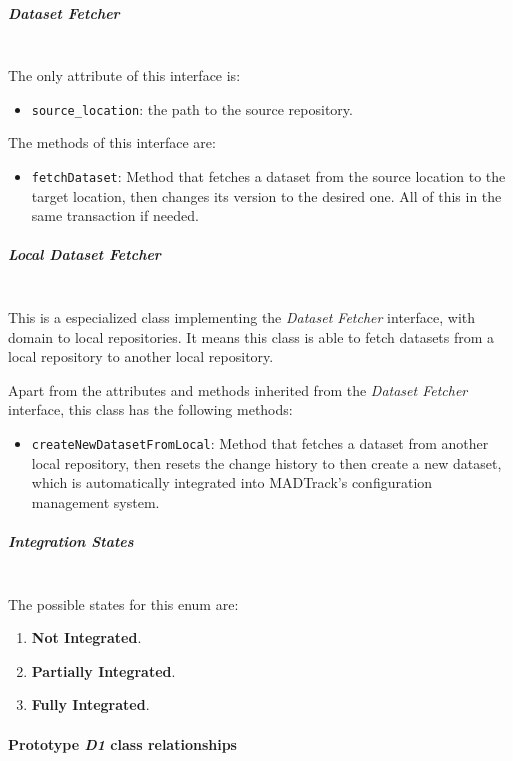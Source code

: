 \subparagraph{Dataset Fetcher}\mbox{}\\

The only attribute of this interface is:

\begin{itemize}
    \item \texttt{source\_location}: the path to the source repository.
\end{itemize}

The methods of this interface are:

\begin{itemize}
    \item \texttt{fetchDataset}: Method that fetches a dataset from the source location to the target location, then changes its version to the desired one. All of this
    in the same transaction if needed.
\end{itemize}

\subparagraph{Local Dataset Fetcher}\mbox{}\\

This is a especialized class implementing the \emph{Dataset Fetcher} interface, with domain to local repositories. It means this class is able to fetch datasets from a local 
repository to another local repository.

Apart from the attributes and methods inherited from the \emph{Dataset Fetcher} interface, this class has the following methods:

\begin{itemize}
    \item \texttt{createNewDatasetFromLocal}: Method that fetches a dataset from another local repository, then resets the change history to then create a new dataset, 
    which is automatically integrated into MADTrack's configuration management system.
\end{itemize}

\subparagraph{Integration States}\mbox{}\\

The possible states for this enum are:

\begin{enumerate}
    \item \textbf{Not Integrated}.
    \item \textbf{Partially Integrated}.
    \item \textbf{Fully Integrated}.
\end{enumerate}

\paragraph{Prototype \emph{D1} class relationships}\mbox{}\\

